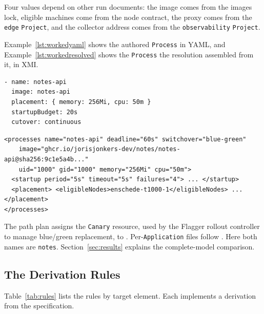 Four values depend on other run documents: the image comes from the images lock, eligible
machines come from the node contract, the proxy comes from the \texttt{edge} \texttt{Project}, and the
collector address comes from the \texttt{observability} \texttt{Project}.

Example~\ref{lst:workedyaml} shows the authored \texttt{Process} in YAML, and
Example~\ref{lst:workedresolved} shows the \texttt{Process} the resolution
assembled from it, in XMI.

\begin{lstlisting}[style=report, caption={The Authored \texttt{Process} \texttt{notes-api}, in YAML (Condensed)}, label={lst:workedyaml}]
- name: notes-api
  image: notes-api
  placement: { memory: 256Mi, cpu: 50m }
  startupBudget: 20s
  cutover: continuous
\end{lstlisting}

\begin{lstlisting}[style=report, caption={The Resolved \texttt{Process} \texttt{notes-api}, in XMI (Abridged)}, label={lst:workedresolved}]
<processes name="notes-api" deadline="60s" switchover="blue-green"
    image="ghcr.io/jorisjonkers-dev/notes/notes-api@sha256:9c1e5a4b..."
    uid="1000" gid="1000" memory="256Mi" cpu="50m">
  <startup period="5s" timeout="5s" failures="4"> ... </startup>
  <placement> <eligibleNodes>enschede-t1000-1</eligibleNodes> ... </placement>
</processes>
\end{lstlisting}

The path plan assigns the \texttt{Canary} resource, used by the Flagger
rollout controller to manage blue/green replacement, to
. Per-\texttt{Application} files follow
. Here both names are \texttt{notes}.
Section~\ref{sec:results} explains the complete-model comparison.

\subsection{The Derivation Rules}
\label{sec:rules}

Table~\ref{tab:rules} lists the rules by target element. Each implements a
derivation from the specification.

